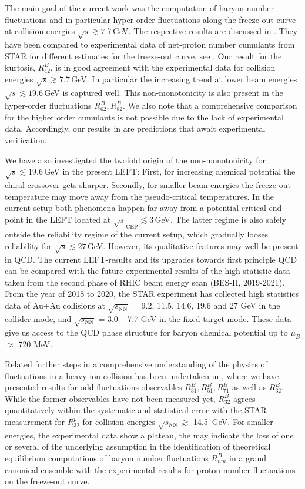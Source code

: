 \documentclass[%
reprint,
superscriptaddress,
showpacs,preprintnumbers,
amsmath,amssymb,
aps,
prd,
]{revtex4-1}
\def\fig#1{\Cref{#1}}
\def\sec#1{\Cref{#1}}
\begin{document}
The main goal of the current work was the computation of baryon number fluctuations and in particular hyper-order fluctuations along the freeze-out curve at collision energies $\sqrt{s}\gtrsim 7.7$\,GeV. The respective results are discussed in \sec{subsec:freezout}. They have been compared to experimental data of net-proton number cumulants from STAR for different estimates for the freeze-out curve, see \fig{fig:Rm2-sqrtS}. 
Our result for the kurtosis, $R^B_{42}$, is in good agreement with the experimental data for collision energies $\sqrt{s}\gtrsim 7.7$\,GeV. In particular the increasing trend at lower beam energies $\sqrt{s}\lesssim 19.6$\,GeV is captured well. This non-monotonicity is also present in the hyper-order fluctuations $R^B_{62}, R^B_{82}$. We also note that a comprehensive comparison for the higher order cumulants is not possible due to the lack of experimental data. Accordingly, our results in \fig{fig:Rm2-sqrtS} are predictions that await experimental verification. 

We have also investigated the twofold origin of the non-monotonicity for $\sqrt{s}\lesssim 19.6$\,GeV in the present LEFT: First, for increasing chemical potential the chiral crossover gets sharper. Secondly, for smaller beam energies the freeze-out temperature may move away from the pseudo-critical temperatures. In the current setup both phenomena happen far away from a potential critical end point in the LEFT located at $\sqrt{s}_\textrm{CEP} \lesssim 3$\,GeV. The latter regime is also safely outside the reliability regime of the current setup, which gradually looses reliability for $\sqrt{s}\lesssim 27$\,GeV. However, its qualitative features may well be present in QCD. The current LEFT-results and its upgrades towards first principle QCD can be compared with the future experimental results of the high statistic data taken from the second phase of RHIC beam energy scan (BES-II, 2019-2021). From the year of 2018 to 2020, the STAR experiment has collected high statistics data of Au+Au collisions at $\sqrt{s_{\mathrm{NN}}}$ = 9.2, 11.5, 14.6, 19.6 and 27 GeV in the collider mode, and $\sqrt{s_{\mathrm{NN}}}$ = 3.0 -- 7.7 GeV in the fixed target mode. These data give us access to the QCD phase structure for baryon chemical potential up to $\mu_{B}$ $\approx$ 720 MeV. 

Related further steps in a comprehensive understanding of the physics of fluctuations in a heavy ion collision has been undertaken in \sec{sec:CEP}, where we have presented results for odd fluctuations observables $R^B_{31},  R^B_{51}, R^B_{71}$ as well as $R^B_{32}$. While the former observables have not been measured yet, $R^B_{32}$ agrees quantitatively within the systematic and statistical error with the STAR measurement for $R^p_{32}$ for collision energies $\sqrt{s_\mathrm{NN}}\gtrsim$ 14.5\, GeV. For smaller energies, the experimental data show a plateau, the may indicate the loss of one or several of the underlying assumption in the identification of theoretical equilibrium computations of baryon number fluctuations $R^B_{nm}$ in a grand canonical ensemble with the experimental results for proton number fluctuations on the freeze-out curve. 
\end{document}
